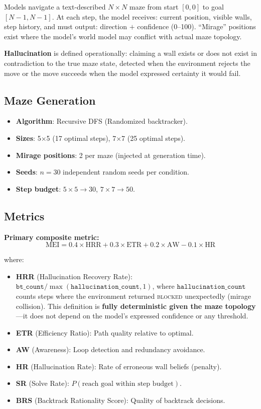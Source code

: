 \documentclass{article}
\begin{document}
Models navigate a text-described $N{\times}N$ maze from start $[0,0]$ to goal $[N{-}1,N{-}1]$.
At each step, the model receives: current position, visible walls, step history, and must output: direction $+$ confidence (0--100).
``Mirage'' positions exist where the model's world model may conflict with actual maze topology.

\textbf{Hallucination} is defined operationally: claiming a wall exists or does not exist in contradiction to the true maze state, detected when the environment rejects the move or the move succeeds when the model expressed certainty it would fail.

\subsection{Maze Generation}

\begin{itemize}[nosep]
  \item \textbf{Algorithm}: Recursive DFS (Randomized backtracker).
  \item \textbf{Sizes}: 5$\times$5 (17 optimal steps), 7$\times$7 (25 optimal steps).
  \item \textbf{Mirage positions}: 2 per maze (injected at generation time).
  \item \textbf{Seeds}: $n{=}30$ independent random seeds per condition.
  \item \textbf{Step budget}: $5\times5 \to 30$, $7\times7 \to 50$.
\end{itemize}

\subsection{Metrics}

\textbf{Primary composite metric:}
\begin{equation}
\text{MEI} = 0.4 \times \text{HRR} + 0.3 \times \text{ETR} + 0.2 \times \text{AW} - 0.1 \times \text{HR}
\label{eq:mei}
\end{equation}

\noindent where:
\begin{itemize}[nosep]
  \item \textbf{HRR} (Hallucination Recovery Rate): $\texttt{bt\_count} / \max(\texttt{hallucination\_count}, 1)$, where $\texttt{hallucination\_count}$ counts steps where the environment returned \textsc{blocked} unexpectedly (mirage collision). This definition is \textbf{fully deterministic given the maze topology}---it does not depend on the model's expressed confidence or any threshold.
  \item \textbf{ETR} (Efficiency Ratio): Path quality relative to optimal.
  \item \textbf{AW} (Awareness): Loop detection and redundancy avoidance.
  \item \textbf{HR} (Hallucination Rate): Rate of erroneous wall beliefs (penalty).
  \item \textbf{SR} (Solve Rate): $P(\text{reach goal within step budget})$.
  \item \textbf{BRS} (Backtrack Rationality Score): Quality of backtrack decisions.
\end{itemize}
\end{document}
